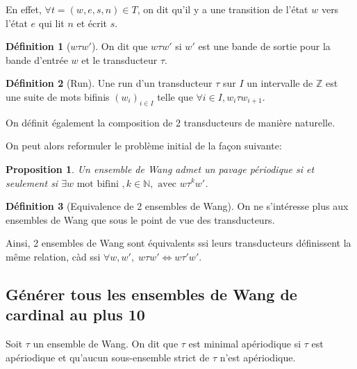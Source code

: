 \documentclass{scrartcl}
\newcommand{\N}{\mathbb N}
\newcommand{\Z}{\mathbb Z}
\newtheorem{proposition}{Proposition}
\theoremstyle{definition}
\newtheorem*{definition}{Définition}
\theoremstyle{remark}
\begin{document}
En effet, $\forall t = (w,e,s,n) \in T$, on dit qu'il y a une transition de l'état $w$ vers l'état $e$ qui lit $n$ et écrit $s$.

\begin{definition}[$w \tau w'$]
    
On dit que $w \tau w'$ si $w'$ est une bande de sortie pour la bande d'entrée $w$ et le transducteur $\tau$.


\end{definition}

\begin{definition}[Run]
    
Une run d'un transducteur $\tau$ sur $I$ un intervalle de $\Z$ est une suite de mots bifinis ${(w_i)}_{i \in I}$
telle que $\forall i \in I, w_i \tau w_{i+1}$.

\end{definition}

On définit également la composition de 2 transducteurs de manière naturelle.

On peut alors reformuler le problème initial de la façon suivante:

\begin{proposition}
    
Un ensemble de Wang admet un pavage périodique si et seulement si $\exists w \text{ mot bifini }, k \in \N, \text{ avec } w \tau^k w'$.

\end{proposition}

\begin{definition}[Equivalence de 2 ensembles de Wang]
    
On ne s'intéresse plus aux ensembles de Wang que sous le point de vue des transducteurs.

Ainsi, 2 ensembles de Wang sont équivalents ssi leurs transducteurs définissent la même relation, càd ssi $\forall w,w', \; w \tau w' \iff w \tau' w'$.


\end{definition}


\subsection{Générer tous les ensembles de Wang de cardinal au plus 10}

Soit $\tau$ un ensemble de Wang. On dit que $\tau$ est minimal apériodique si $\tau$ est apériodique
et qu'aucun sous-ensemble strict de $\tau$ n'est apériodique.

\;
\end{document}
